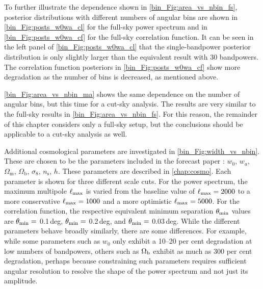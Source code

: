To further illustrate the dependence shown in \autoref{bin_Fig:area_vs_nbin_fs}, posterior distributions with different numbers of angular bins are shown in \autoref{bin_Fig:posts_w0wa_cl} for the full-sky power spectrum and in \autoref{bin_Fig:posts_w0wa_cf} for the full-sky correlation function. It can be seen in the left panel of \autoref{bin_Fig:posts_w0wa_cl} that the single-bandpower posterior distribution is only slightly larger than the equivalent result with 30 bandpowers. The correlation function posteriors in \autoref{bin_Fig:posts_w0wa_cf} show more degradation as the number of bins is decreased, as mentioned above.

\autoref{bin_Fig:area_vs_nbin_ma} shows the same dependence on the number of angular bins, but this time for a cut-sky analysis. The results are very similar to the full-sky results in \autoref{bin_Fig:area_vs_nbin_fs}. For this reason, the remainder of this chapter considers only a full-sky setup, but the conclusions should be applicable to a cut-sky analysis as well.

Additional cosmological parameters are investigated in \autoref{bin_Fig:width_vs_nbin}. These are chosen to be the parameters included in the \Euclid{} forecast paper \citep{Blanchard2020}: $w_0$, $w_a$, $\Omega_\text{m}$, $\Omega_\text{b}$, $\sigma_8$, $n_\text{s}$, $h$. These parameters are described in \autoref{chap:cosmo}. Each parameter is shown for three different scale cuts. For the power spectrum, the maximum multipole $\ell_\text{max}$ is varied from the baseline value of $\ell_\text{max} = 2000$ to a more conservative $\ell_\text{max} = 1000$ and a more optimistic $\ell_\text{max} = 5000$. For the correlation function, the respective equivalent minimum separation $\theta_\text{min}$ values are $\theta_\text{min} =$ 0.1\,deg, $\theta_\text{min} =$ 0.2\,deg, and $\theta_\text{min} =$ 0.03\,deg. While the different parameters behave broadly similarly, there are some differences. For example, while some parameters such as $w_0$ only exhibit a 10--20 per cent degradation at low numbers of bandpowers, others such as $\Omega_\text{b}$ exhibit as much as 300 per cent degradation, perhaps because constraining such parameters requires sufficient angular resolution to resolve the shape of the power spectrum and not just its amplitude.

